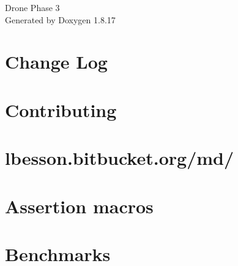 \let\mypdfximage\pdfximage\def\pdfximage{\immediate\mypdfximage}\documentclass[twoside]{book}
\newcommand{\+}{\discretionary{\mbox{\scriptsize$\hookleftarrow$}}{}{}}
\newcommand{\clearemptydoublepage}{%
  \newpage{\pagestyle{empty}\cleardoublepage}%
}
\begin{document}
\hypersetup{pageanchor=false,
             bookmarksnumbered=true,
             pdfencoding=unicode
            }
\begin{titlepage}
\vspace*{7cm}
\begin{center}%
{\Large Drone Phase 3 }\\
\vspace*{1cm}
{\large Generated by Doxygen 1.8.17}\\
\end{center}
\end{titlepage}
\clearemptydoublepage
{}
\tableofcontents
\clearemptydoublepage
{}
\hypersetup{pageanchor=true}

\chapter{Change Log}
\label{md_external_doctest__c_h_a_n_g_e_l_o_g}

\chapter{Contributing}
\label{md_external_doctest__c_o_n_t_r_i_b_u_t_i_n_g}

\chapter{lbesson.\+bitbucket.\+org/md/}
\label{md_external_doctest_doc_html_generated_strapdown_8js__r_e_a_d_m_e}

\chapter{Assertion macros}
\label{md_external_doctest_doc_markdown_assertions}

\chapter{Benchmarks}
\label{md_external_doctest_doc_markdown_benchmarks}

\end{document}

